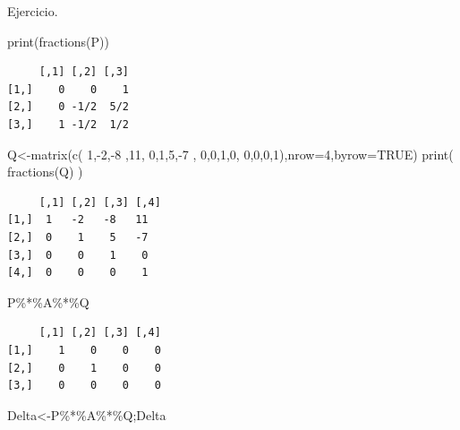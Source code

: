 \documentclass[
  ignorenonframetext,
  aspectratio=169,
  spanish,
]{beamer}
\newenvironment{Shaded}{\begin{snugshade}}{\end{snugshade}}
\newcommand{\AttributeTok}[1]{\textcolor[rgb]{0.40,0.45,0.13}{#1}}
\newcommand{\ConstantTok}[1]{\textcolor[rgb]{0.56,0.35,0.01}{#1}}
\newcommand{\DecValTok}[1]{\textcolor[rgb]{0.68,0.00,0.00}{#1}}
\newcommand{\FunctionTok}[1]{\textcolor[rgb]{0.28,0.35,0.67}{#1}}
\newcommand{\NormalTok}[1]{\textcolor[rgb]{0.00,0.23,0.31}{#1}}
\newcommand{\OtherTok}[1]{\textcolor[rgb]{0.00,0.23,0.31}{#1}}
\newcommand{\SpecialCharTok}[1]{\textcolor[rgb]{0.37,0.37,0.37}{#1}}
\begin{document}
\begin{frame}[fragile]{}
\begin{block}{Ejercicio.}
\begin{Shaded}
\begin{Highlighting}[]
\FunctionTok{print}\NormalTok{(}\FunctionTok{fractions}\NormalTok{(P))}
\end{Highlighting}
\end{Shaded}

\begin{verbatim}
     [,1] [,2] [,3]
[1,]    0    0    1
[2,]    0 -1/2  5/2
[3,]    1 -1/2  1/2
\end{verbatim}

\begin{Shaded}
\begin{Highlighting}[]
\NormalTok{Q}\OtherTok{\textless{}{-}}\FunctionTok{matrix}\NormalTok{(}\FunctionTok{c}\NormalTok{( }\DecValTok{1}\NormalTok{,}\SpecialCharTok{{-}}\DecValTok{2}\NormalTok{,}\SpecialCharTok{{-}}\DecValTok{8}\NormalTok{ ,}\DecValTok{11}\NormalTok{,}
    \DecValTok{0}\NormalTok{,}\DecValTok{1}\NormalTok{,}\DecValTok{5}\NormalTok{,}\SpecialCharTok{{-}}\DecValTok{7}\NormalTok{ ,}
    \DecValTok{0}\NormalTok{,}\DecValTok{0}\NormalTok{,}\DecValTok{1}\NormalTok{,}\DecValTok{0}\NormalTok{,}
    \DecValTok{0}\NormalTok{,}\DecValTok{0}\NormalTok{,}\DecValTok{0}\NormalTok{,}\DecValTok{1}\NormalTok{),}\AttributeTok{nrow=}\DecValTok{4}\NormalTok{,}\AttributeTok{byrow=}\ConstantTok{TRUE}\NormalTok{) }
     \FunctionTok{print}\NormalTok{( }\FunctionTok{fractions}\NormalTok{(Q) )}
\end{Highlighting}
\end{Shaded}

\begin{verbatim}
     [,1] [,2] [,3] [,4]
[1,]  1   -2   -8   11  
[2,]  0    1    5   -7  
[3,]  0    0    1    0  
[4,]  0    0    0    1  
\end{verbatim}

\begin{Shaded}
\begin{Highlighting}[]
\NormalTok{P}\SpecialCharTok{\%*\%}\NormalTok{A}\SpecialCharTok{\%*\%}\NormalTok{Q}
\end{Highlighting}
\end{Shaded}

\begin{verbatim}
     [,1] [,2] [,3] [,4]
[1,]    1    0    0    0
[2,]    0    1    0    0
[3,]    0    0    0    0
\end{verbatim}

\begin{Shaded}
\begin{Highlighting}[]
\NormalTok{Delta}\OtherTok{\textless{}{-}}\NormalTok{P}\SpecialCharTok{\%*\%}\NormalTok{A}\SpecialCharTok{\%*\%}\NormalTok{Q;Delta}
\end{Highlighting}
\end{Shaded}


\end{block}
\end{frame}
\end{document}
